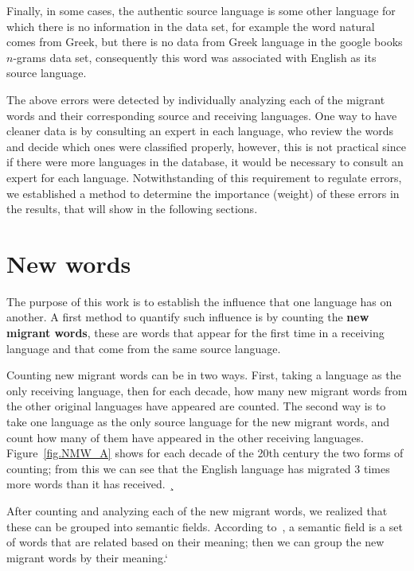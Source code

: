 \documentclass[10pt,letterpaper]{article} %
\begin{document}
	 Finally, in some cases, the authentic source language is some other language for which there is no information in the data set, for example the word  natural comes from Greek, but there is no data from Greek language in the google books $n$-grams data set, consequently this word was associated with English as its source language.
	
	The above errors were detected by individually analyzing each of the migrant words and their corresponding source and receiving languages. One way to have cleaner data is by consulting an expert in each language, who review the words and decide which ones were classified properly, however, this is not practical since if there were more languages in the database, it would be necessary to consult an expert for each language. Notwithstanding of this requirement to  regulate errors, we established a method to determine the importance (weight) of these errors in the results, that will show in the following sections. 
	
	\section*{New words} %
	 
	The purpose of this work is to establish the influence that one language has on another. A first method to quantify such influence is by counting the \textbf{new migrant words}, these are words that appear for the first time in a receiving language and that come from the same source language.
	
	Counting new migrant words can be in two ways. First, taking a language as the only receiving language, then for each decade, how many new migrant words from the other original languages ​​have appeared are counted. The second way is to take one language as the only source language for the new migrant words, and count how many of them have appeared in the other receiving languages.
	Figure~\ref{fig.NMW_A} shows for each decade of the 20th century the two forms of counting; from this we can see that the English language has migrated 3 times more words than it has received.
	¸
	
	After counting and analyzing each of the new migrant words, we realized that these can be grouped into semantic fields. According to~\cite{semantic_oxford}, a semantic field is a set of words that are related based on their meaning; then we can group the new migrant words by their meaning.`
	
\end{document}
